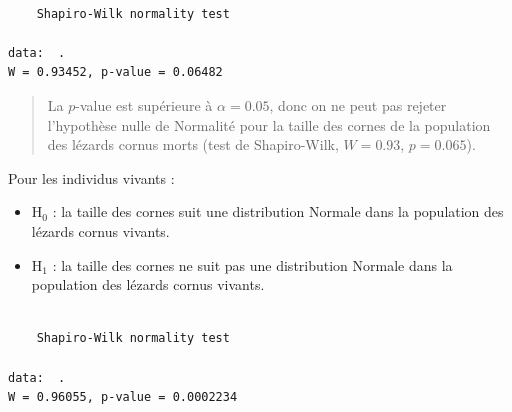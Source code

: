 \documentclass[a4paperpaper,]{article}
\newenvironment{Shaded}{\begin{snugshade}}{\end{snugshade}}
\newcommand{\KeywordTok}[1]{\textcolor[rgb]{0.12,0.11,0.11}{\textbf{#1}}}
\newcommand{\NormalTok}[1]{\textcolor[rgb]{0.12,0.11,0.11}{#1}}
\newcommand{\OperatorTok}[1]{\textcolor[rgb]{0.12,0.11,0.11}{#1}}
\newcommand{\StringTok}[1]{\textcolor[rgb]{0.75,0.01,0.01}{#1}}
\providecommand{\tightlist}{%
  \setlength{\itemsep}{0pt}\setlength{\parskip}{0pt}}
\begin{document}
\begin{Shaded}
\end{Shaded}

\begin{verbatim}

    Shapiro-Wilk normality test

data:  .
W = 0.93452, p-value = 0.06482
\end{verbatim}

\begin{quote}
La \(p\)-value est supérieure à \(\alpha = 0.05\), donc on ne peut pas rejeter l'hypothèse nulle de Normalité pour la taille des cornes de la population des lézards cornus morts (test de Shapiro-Wilk, \(W = 0.93\), \(p = 0.065\)).
\end{quote}

Pour les individus vivants :

\begin{itemize}
\tightlist
\item
  H\(_0\) : la taille des cornes suit une distribution Normale dans la population des lézards cornus vivants.
\item
  H\(_1\) : la taille des cornes ne suit pas une distribution Normale dans la population des lézards cornus vivants.
\end{itemize}

\begin{Shaded}
\end{Shaded}

\begin{verbatim}

    Shapiro-Wilk normality test

data:  .
W = 0.96055, p-value = 0.0002234
\end{verbatim}
\end{document}

